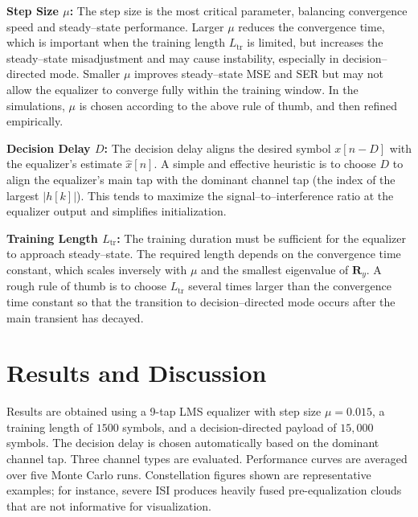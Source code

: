 \documentclass[12pt]{article}
\begin{document}
\textbf{Step Size $\mu$:} The step size is the most critical parameter, balancing convergence speed and steady--state performance. Larger $\mu$ reduces the convergence time, which is important when the training length $L_{\text{tr}}$ is limited, but increases the steady--state misadjustment and may cause instability, especially in decision--directed mode. Smaller $\mu$ improves steady--state MSE and SER but may not allow the equalizer to converge fully within the training window. In the simulations, $\mu$ is chosen according to the above rule of thumb, and then refined empirically.

\textbf{Decision Delay $D$:} The decision delay aligns the desired symbol $x[n-D]$ with the equalizer’s estimate $\hat{x}[n]$. A simple and effective heuristic is to choose $D$ to align the equalizer’s main tap with the dominant channel tap (the index of the largest $|h[k]|$). This tends to maximize the signal--to--interference ratio at the equalizer output and simplifies initialization.

\textbf{Training Length $L_{\text{tr}}$:} The training duration must be sufficient for the equalizer to approach steady--state. The required length depends on the convergence time constant, which scales inversely with $\mu$ and the smallest eigenvalue of $\mathbf{R}_y$. A rough rule of thumb is to choose $L_{\text{tr}}$ several times larger than the convergence time constant so that the transition to decision--directed mode occurs after the main transient has decayed.





\section{Results and Discussion}\label{sec:results}
Results are obtained using a 9-tap LMS equalizer with
step size $\mu = 0.015$, a training length of $1500$ symbols, and a
decision-directed payload of $15{,}000$ symbols. The decision delay is chosen
automatically based on the dominant channel tap. Three channel types are evaluated. Performance curves are averaged over five Monte Carlo
runs. Constellation figures shown are representative examples; for instance, severe ISI produces heavily fused pre-equalization clouds that are not informative for visualization.
\end{document}
